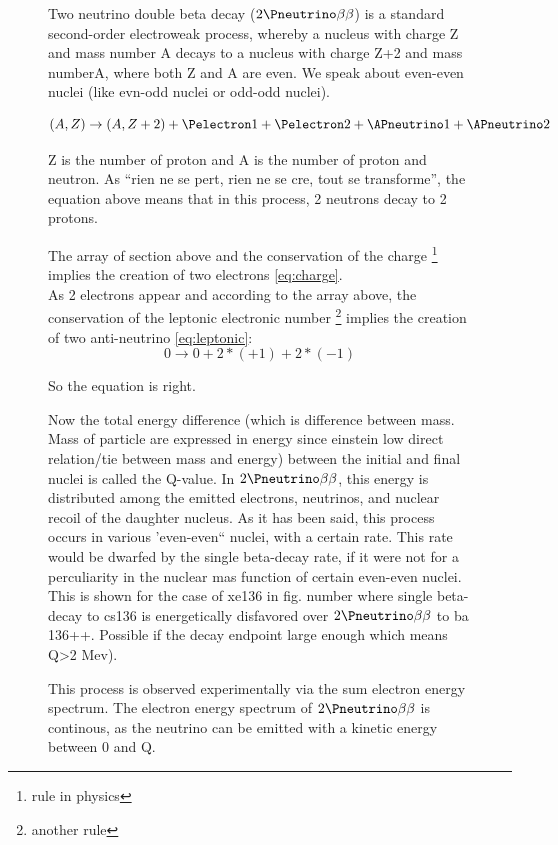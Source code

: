 \begin{figure}[!hbtp]
{{ %
 
 Two neutrino double beta decay (\(2\Pneutrino\beta\beta\)) is a standard second-order electroweak
 process, whereby a nucleus with charge Z and mass number A decays to a nucleus
 with charge Z+2 and mass numberA, where both Z and A are even. We speak about even-even nuclei (like evn-odd nuclei or odd-odd nuclei). 
 
 \begin{equation} \label{eq:charge}
    (A,Z) \rightarrow (A,Z+2) + \Pelectron1 + \Pelectron2 + \APneutrino1 + \APneutrino2
 \end{equation}
 
 Z is the number of proton and A is the number of proton and neutron. As ``rien ne se pert, rien ne se cre, tout se transforme'', 
 the equation above means that in this process, 2 neutrons decay to 2 protons. 
 
 The array of section above and the conservation of the charge \footnote{rule in physics} 
 implies the creation of two electrons \ref{eq:charge}. \\
 
 As 2 electrons appear and according to the array above, the conservation of the leptonic electronic number \footnote{another rule} 
 implies the creation of two anti-neutrino \ref{eq:leptonic}:  
 \begin{equation} \label{eq:leptonic}
    0 \rightarrow 0 + 2*(+1) + 2*(-1)
 \end{equation}
  
 So the equation is right. 
 
 Now the total energy difference (which is difference between mass. Mass of particle are expressed in energy since einstein low
 direct relation/tie between mass and energy) between the initial and final nuclei
 is called the Q-value. In \(2\Pneutrino\beta\beta\), this energy is distributed among the emitted electrons, neutrinos, and nuclear 
 recoil of the daughter nucleus. As it has been said, this process occurs in various
 'even-even`` nuclei, with a certain rate. This rate would be dwarfed by the single 
 beta-decay rate, if it were not for a perculiarity in the nuclear mas function of certain
 even-even nuclei. This is shown for the case of xe136 in fig. number where single beta-decay to cs136 is energetically disfavored
 over \(2\Pneutrino\beta\beta\) to ba 136++. Possible  if the decay endpoint large enough which means Q>2 Mev). 
 
 This process is observed experimentally via the sum electron energy spectrum. 
 The electron energy spectrum of \(2\Pneutrino\beta\beta\) is continous, as the neutrino can be emitted with a kinetic
 energy between 0 and Q. 
 
}}
\end{figure}
